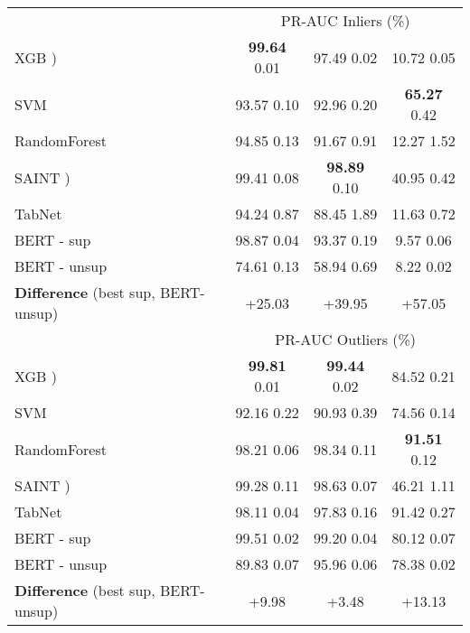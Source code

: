 \documentclass{article}
\begin{document}
\begin{table}[t]
\begin{center}
\begin{tabular}{lccc}
    \midrule
     & \multicolumn{3}{c}{PR-AUC Inliers (\%) }  \\
    \cmidrule(lr){2-4}
    XGB \cite{chen2015xgboost})          & \textbf{99.64}  \small 0.01     &  97.49  \small	0.02   & 10.72  \small	0.05    \\
    SVM \cite{cortes1995support}         & 93.57  \small	0.10     & 92.96  \small	0.20    & \textbf{65.27}  \small	0.42   \\
    RandomForest \cite{liaw2002classification} & 94.85  \small	0.13     & 91.67  \small	0.91    & 12.27  \small	1.52    \\
    SAINT \cite{somepalli2021saint})        & 99.41  \small	0.08     & \textbf{98.89}  \small 0.10    & 40.95  \small	0.42    \\
    TabNet \cite{arik2021tabnet}       & 94.24  \small	0.87     & 88.45  \small	1.89    & 11.63  \small	0.72    \\
    BERT \cite{devlin2018bert} - sup     & 98.87  \small	0.04     & 93.37  \small	0.19    & 9.57  \small	0.06     \\
    \midrule
    BERT \cite{devlin2018bert} - unsup   & 74.61  \small 0.13     & 58.94  \small 0.69    & 8.22  \small 0.02    \\
    \textbf{Difference} (best sup, BERT-unsup)   & +25.03    & +39.95      &+57.05    \\

    \midrule
                 & \multicolumn{3}{c}{PR-AUC Outliers (\%) } \\
    \cmidrule(lr){2-4}
    XGB \cite{chen2015xgboost})         & \textbf{99.81}  \small 0.01     & \textbf{99.44}  \small 0.02    & 84.52  \small	0.21 \\
    SVM \cite{cortes1995support}         & 92.16  \small	0.22     & 90.93  \small	0.39    & 74.56  \small	0.14    \\
    RandomForest \cite{liaw2002classification} & 98.21  \small	0.06     & 98.34  \small	0.11    & \textbf{91.51}  \small 0.12    \\
    SAINT \cite{somepalli2021saint})        & 99.28  \small	0.11     & 98.63  \small	0.07    & 46.21  \small	1.11 \\
    TabNet \cite{arik2021tabnet}       & 98.11  \small	0.04     & 97.83  \small	0.16    & 91.42	  \small 0.27    \\
    BERT \cite{devlin2018bert} - sup     & 99.51  \small	0.02     & 99.20  \small	0.04    & 80.12  \small	0.07    \\
    \midrule
    BERT \cite{devlin2018bert} - unsup   & 89.83  \small 0.07     & 95.96  \small 0.06    & 78.38  \small 0.02    \\
    \textbf{Difference} (best sup, BERT-unsup)   & +9.98 & +3.48      &+13.13    \\

    \bottomrule
    \end{tabular}

    \label{aptab:supervised_gap}
\end{center}
\end{table}
\endgroup
\end{document}

